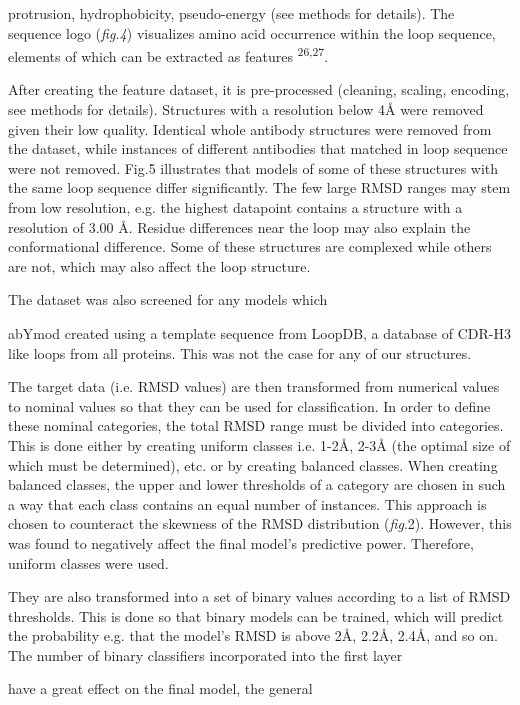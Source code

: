 \documentclass[
]{article}
\begin{document}
protrusion, hydrophobicity, pseudo-energy (see methods for details). The
sequence logo (\emph{fig.4}) visualizes amino acid occurrence within the
loop sequence, elements of which can be extracted as features
\textsuperscript{26,27}.

After creating the feature dataset, it is pre-processed (cleaning,
scaling, encoding, see methods for details). Structures with a
resolution below 4Å were removed given their low quality. Identical
whole antibody structures were removed from the dataset, while instances
of different antibodies that matched in loop sequence were not removed.
Fig.5 illustrates that models of some of these structures with the same
loop sequence differ significantly. The few large RMSD ranges may stem
from low resolution, e.g. the highest datapoint contains a structure
with a resolution of 3.00 Å. Residue differences near the loop may also
explain the conformational difference. Some of these structures are
complexed while others are not, which may also affect the loop
structure.

The dataset was also screened for any models which

abYmod created using a template sequence from LoopDB, a database of
CDR-H3 like loops from all proteins. This was not the case for any of
our structures.

The target data (i.e. RMSD values) are then transformed from numerical
values to nominal values so that they can be used for classification. In
order to define these nominal categories, the total RMSD range must be
divided into categories. This is done either by creating uniform classes
i.e. 1-2Å, 2-3Å (the optimal size of which must be determined), etc. or
by creating balanced classes. When creating balanced classes, the upper
and lower thresholds of a category are chosen in such a way that each
class contains an equal number of instances. This approach is chosen to
counteract the skewness of the RMSD distribution (\emph{fig}.2).
However, this was found to negatively affect the final model's
predictive power. Therefore, uniform classes were used.

They are also transformed into a set of binary values according to a
list of RMSD thresholds. This is done so that binary models can be
trained, which will predict the probability e.g. that the model's RMSD
is above 2Å, 2.2Å, 2.4Å, and so on. The number of binary classifiers
incorporated into the first layer

have a great effect on the final model, the general
\end{document}
